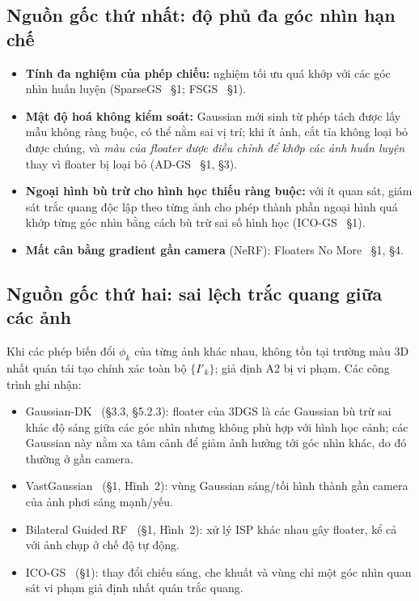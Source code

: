\documentclass[11pt,a4paper]{article}
\begin{document}
\subsection{Nguồn gốc thứ nhất: độ phủ đa góc nhìn hạn chế}
\begin{itemize}
  \item \textbf{Tính đa nghiệm của phép chiếu:} nghiệm tối ưu quá khớp với các góc nhìn huấn luyện (SparseGS~\cite{sparsegs} §1; FSGS~\cite{fsgs} §1).
  \item \textbf{Mật độ hoá không kiểm soát:} Gaussian mới sinh từ phép tách được lấy mẫu không ràng buộc, có thể nằm sai vị trí; khi ít ảnh, cắt tỉa không loại bỏ được chúng, và \emph{màu của floater được điều chỉnh để khớp các ảnh huấn luyện} thay vì floater bị loại bỏ (AD-GS~\cite{adgs} §1, §3).
  \item \textbf{Ngoại hình bù trừ cho hình học thiếu ràng buộc:} với ít quan sát, giám sát trắc quang độc lập theo từng ảnh cho phép thành phần ngoại hình quá khớp từng góc nhìn bằng cách bù trừ sai số hình học (ICO-GS~\cite{icogs} §1).
  \item \textbf{Mất cân bằng gradient gần camera} (NeRF): Floaters No More~\cite{fnm} §1, §4.
\end{itemize}

\subsection{Nguồn gốc thứ hai: sai lệch trắc quang giữa các ảnh}
Khi các phép biến đổi $\phi_k$ của từng ảnh khác nhau, không tồn tại trường màu 3D nhất quán tái tạo chính xác toàn bộ $\{I'_k\}$; giả định A2 bị vi phạm. Các công trình ghi nhận:
\begin{itemize}
  \item Gaussian-DK~\cite{gaussiandk} (§3.3, §5.2.3): floater của 3DGS là các Gaussian bù trừ sai khác độ sáng giữa các góc nhìn nhưng không phù hợp với hình học cảnh; các Gaussian này nằm xa tâm cảnh để giảm ảnh hưởng tới góc nhìn khác, do đó thường ở gần camera.
  \item VastGaussian~\cite{vastgaussian} (§1, Hình~2): vùng Gaussian sáng/tối hình thành gần camera của ảnh phơi sáng mạnh/yếu.
  \item Bilateral Guided RF~\cite{bilarf} (§1, Hình~2): xử lý ISP khác nhau gây floater, kể cả với ảnh chụp ở chế độ tự động.
  \item ICO-GS~\cite{icogs} (§1): thay đổi chiếu sáng, che khuất và vùng chỉ một góc nhìn quan sát vi phạm giả định nhất quán trắc quang.
\end{itemize}
\end{document}
